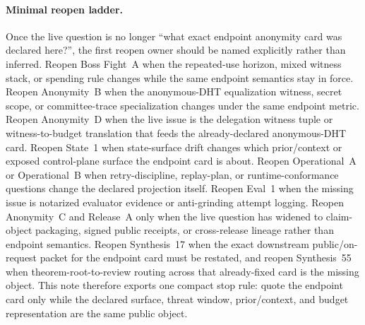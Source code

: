 \documentclass[11pt]{article}
\theoremstyle{definition}
\theoremstyle{remark}
\begin{document}
\paragraph{Minimal reopen ladder.}
Once the live question is no longer ``what exact endpoint anonymity card was declared here?'', the first reopen owner should be named explicitly rather than inferred. Reopen Boss Fight~A when the repeated-use horizon, mixed witness stack, or spending rule changes while the same endpoint semantics stay in force. Reopen Anonymity~B when the anonymous-DHT equalization witness, secret scope, or committee-trace specialization changes under the same endpoint metric. Reopen Anonymity~D when the live issue is the delegation witness tuple or witness-to-budget translation that feeds the already-declared anonymous-DHT card. Reopen State~1 when state-surface drift changes which prior/context or exposed control-plane surface the endpoint card is about. Reopen Operational~A or Operational~B when retry-discipline, replay-plan, or runtime-conformance questions change the declared projection itself. Reopen Eval~1 when the missing issue is notarized evaluator evidence or anti-grinding attempt logging. Reopen Anonymity~C and Release~A only when the live question has widened to claim-object packaging, signed public receipts, or cross-release lineage rather than endpoint semantics. Reopen Synthesis~17 when the exact downstream public/on-request packet for the endpoint card must be restated, and reopen Synthesis~55 when theorem-root-to-review routing across that already-fixed card is the missing object. This note therefore exports one compact stop rule: quote the endpoint card only while the declared surface, threat window, prior/context, and budget representation are the same public object.\cite{series:workedexample,series:seriesspines,series:bossfightA,series:profiling,series:spectral2budget,series:state1,series:operationalA,series:operationalB,series:eval1,series:abomoinl,series:releaseA}
\end{document}
